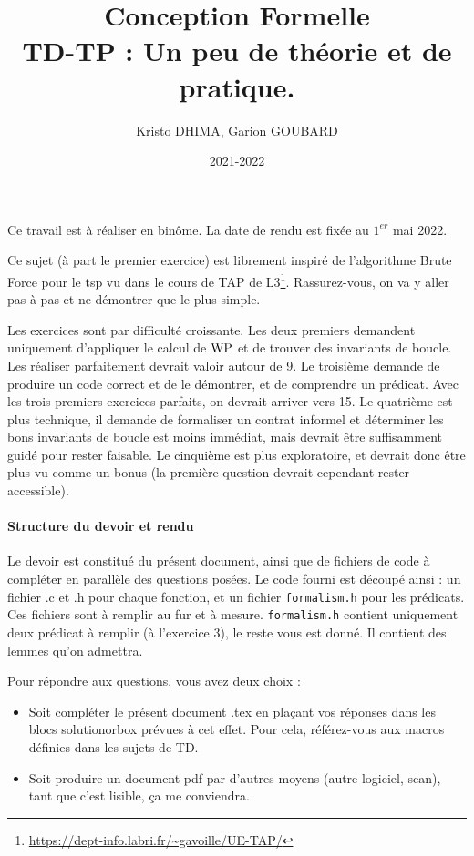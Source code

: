 \documentclass[11pt,answers]{exam}
\author{Kristo DHIMA, Garion GOUBARD}
\date{2021-2022}
\title{{\bf Conception Formelle} \\ TD-TP : Un peu de théorie et de pratique.}
\begin{document}
\maketitle

Ce travail est à réaliser en binôme. La date de rendu est fixée au $1^{er}$ mai 2022.

Ce sujet (à part le premier exercice) est librement inspiré de l’algorithme Brute Force pour le tsp vu dans le cours de TAP de L3\footnote{\url{https://dept-info.labri.fr/~gavoille/UE-TAP/}}.
Rassurez-vous, on va y aller pas à pas et ne démontrer que le plus simple.

Les exercices sont par difficulté croissante. Les deux premiers demandent uniquement d’appliquer le calcul de $\mathrm{WP}$ et de trouver des invariants de boucle.
Les réaliser parfaitement devrait valoir autour de 9.
Le troisième demande de produire un code correct et de le démontrer, et de comprendre un prédicat. Avec les trois premiers exercices parfaits, on devrait arriver vers 15.
Le quatrième est plus technique, il demande de formaliser un contrat informel et déterminer les bons invariants de boucle est moins immédiat, mais devrait être suffisamment guidé pour rester faisable.
Le cinquième est plus exploratoire, et devrait donc être plus vu comme un bonus (la première question devrait cependant rester accessible).

\paragraph{Structure du devoir et rendu}

Le devoir est constitué du présent document, ainsi que de fichiers de code à compléter en parallèle des questions posées.
Le code fourni est découpé ainsi : un fichier .c et .h pour chaque fonction, et
un fichier \texttt{formalism.h} pour les prédicats.
Ces fichiers sont à remplir au fur et à mesure. \texttt{formalism.h} contient uniquement deux prédicat à remplir (à l’exercice 3), le reste vous est donné. Il contient des lemmes qu’on admettra.

Pour répondre aux questions, vous avez deux choix :
\begin{itemize}
    \item Soit compléter le présent document .tex en plaçant vos réponses dans les blocs solutionorbox prévues à cet effet. Pour cela, référez-vous aux macros définies dans les sujets de TD.
    \item Soit produire un document pdf par d’autres moyens (autre logiciel, scan), tant que c’est lisible, ça me conviendra.
\end{itemize}
\end{document}
